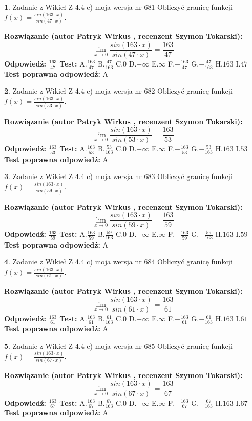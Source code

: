 \documentclass[12pt, a4paper]{article}
\theoremstyle{definition} %
\newtheorem{zad}{}
\newcommand{\zadStart}[1]{\begin{zad}#1\newline}
\newcommand{\zadStop}{\end{zad}}
\newcommand{\rozwStart}[2]{\noindent \textbf{Rozwiązanie (autor #1 , recenzent #2): }\newline}
\newcommand{\rozwStop}{\newline}
\newcommand{\odpStart}{\noindent \textbf{Odpowiedź:}\newline}
\newcommand{\odpStop}{\newline}
\newcommand{\testStart}{\noindent \textbf{Test:}\newline}
\newcommand{\testStop}{\newline}
\newcommand{\kluczStart}{\noindent \textbf{Test poprawna odpowiedź:}\newline}
\newcommand{\kluczStop}{\newline}
\begin{document}
\zadStart{Zadanie z Wikieł Z 4.4 c) moja wersja nr 681}
Obliczyć granicę funkcji $f(x)=\frac{sin(163\cdot x)}{sin(47\cdot x)}$.
\zadStop
\rozwStart{Patryk Wirkus}{Szymon Tokarski}
$$\lim\limits_{x\to 0}\frac{sin(163\cdot x)}{sin(47\cdot x)}=
\frac{163}{47}$$
\rozwStop
\odpStart
$\frac{163}{47}$
\odpStop
\testStart
A.$\frac{163}{47}$
B.$\frac{47}{163}$
C.$0$
D.$-\infty$
E.$\infty$
F.$-\frac{163}{47}$
G.$-\frac{47}{163}$
H.$163$
I.$47$
\testStop
\kluczStart
A
\kluczStop



\zadStart{Zadanie z Wikieł Z 4.4 c) moja wersja nr 682}
Obliczyć granicę funkcji $f(x)=\frac{sin(163\cdot x)}{sin(53\cdot x)}$.
\zadStop
\rozwStart{Patryk Wirkus}{Szymon Tokarski}
$$\lim\limits_{x\to 0}\frac{sin(163\cdot x)}{sin(53\cdot x)}=
\frac{163}{53}$$
\rozwStop
\odpStart
$\frac{163}{53}$
\odpStop
\testStart
A.$\frac{163}{53}$
B.$\frac{53}{163}$
C.$0$
D.$-\infty$
E.$\infty$
F.$-\frac{163}{53}$
G.$-\frac{53}{163}$
H.$163$
I.$53$
\testStop
\kluczStart
A
\kluczStop



\zadStart{Zadanie z Wikieł Z 4.4 c) moja wersja nr 683}
Obliczyć granicę funkcji $f(x)=\frac{sin(163\cdot x)}{sin(59\cdot x)}$.
\zadStop
\rozwStart{Patryk Wirkus}{Szymon Tokarski}
$$\lim\limits_{x\to 0}\frac{sin(163\cdot x)}{sin(59\cdot x)}=
\frac{163}{59}$$
\rozwStop
\odpStart
$\frac{163}{59}$
\odpStop
\testStart
A.$\frac{163}{59}$
B.$\frac{59}{163}$
C.$0$
D.$-\infty$
E.$\infty$
F.$-\frac{163}{59}$
G.$-\frac{59}{163}$
H.$163$
I.$59$
\testStop
\kluczStart
A
\kluczStop



\zadStart{Zadanie z Wikieł Z 4.4 c) moja wersja nr 684}
Obliczyć granicę funkcji $f(x)=\frac{sin(163\cdot x)}{sin(61\cdot x)}$.
\zadStop
\rozwStart{Patryk Wirkus}{Szymon Tokarski}
$$\lim\limits_{x\to 0}\frac{sin(163\cdot x)}{sin(61\cdot x)}=
\frac{163}{61}$$
\rozwStop
\odpStart
$\frac{163}{61}$
\odpStop
\testStart
A.$\frac{163}{61}$
B.$\frac{61}{163}$
C.$0$
D.$-\infty$
E.$\infty$
F.$-\frac{163}{61}$
G.$-\frac{61}{163}$
H.$163$
I.$61$
\testStop
\kluczStart
A
\kluczStop



\zadStart{Zadanie z Wikieł Z 4.4 c) moja wersja nr 685}
Obliczyć granicę funkcji $f(x)=\frac{sin(163\cdot x)}{sin(67\cdot x)}$.
\zadStop
\rozwStart{Patryk Wirkus}{Szymon Tokarski}
$$\lim\limits_{x\to 0}\frac{sin(163\cdot x)}{sin(67\cdot x)}=
\frac{163}{67}$$
\rozwStop
\odpStart
$\frac{163}{67}$
\odpStop
\testStart
A.$\frac{163}{67}$
B.$\frac{67}{163}$
C.$0$
D.$-\infty$
E.$\infty$
F.$-\frac{163}{67}$
G.$-\frac{67}{163}$
H.$163$
I.$67$
\testStop
\kluczStart
A
\kluczStop
\end{document}
